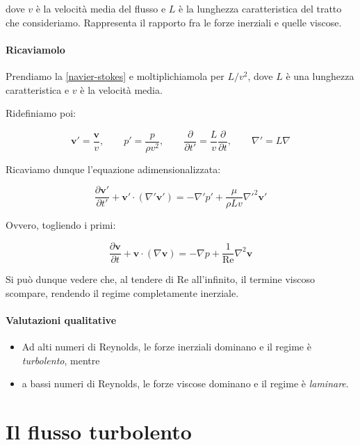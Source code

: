 \documentclass[12pt,a4paper]{article}
\numberwithin{equation}{section}
\begin{document}
dove $v$ è la velocità media del flusso e $L$ è la lunghezza caratteristica del tratto che consideriamo.
Rappresenta il rapporto fra le forze inerziali e quelle viscose.

\paragraph{Ricaviamolo}

Prendiamo la \ref{navier-stokes} e moltiplichiamola per $L/v^2$, dove $L$ è una lunghezza caratteristica e $v$ è la velocità media.

Ridefiniamo poi: 

\begin{equation}
\mathbf{v'} = \frac{\mathbf{v}}{v},\qquad p' = \frac{p}{\rho v^2},\qquad \frac{\partial}{\partial t'} = \frac{L}{v} \frac{\partial}{\partial t},\qquad \nabla' = L \nabla
\end{equation}

Ricaviamo dunque l'equazione adimensionalizzata: 

\begin{equation}
\frac{\partial \mathbf{v'}}{\partial t'} +\mathbf{v'} \cdot (\nabla' \mathbf{v'})  = -\nabla' p' + \frac{\mu}{\rho L v} \nabla'^2 \mathbf{v'}
\end{equation}

Ovvero, togliendo i primi:

\begin{equation}
\frac{\partial \mathbf{v}}{\partial t} +\mathbf{v} \cdot (\nabla \mathbf{v}) = -\nabla p + \frac{1}{\text{Re}} \nabla^2 \mathbf{v}
\end{equation}

Si può dunque vedere che, al tendere di Re all'infinito, il termine viscoso scompare, rendendo il regime completamente inerziale.

\paragraph{Valutazioni qualitative}

\begin{itemize}
\item Ad alti numeri di Reynolds, le forze inerziali dominano e il regime è \emph{turbolento}, mentre
\item a bassi numeri di Reynolds, le forze viscose dominano e il regime è \emph{laminare}.
\end{itemize}

\section{Il flusso turbolento}
\end{document}
